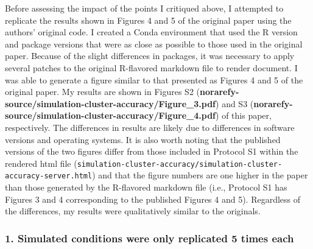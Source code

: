 \documentclass[
]{article}
\begin{document}
Before assessing the impact of the points I critiqued above, I attempted
to replicate the results shown in Figures 4 and 5 of the original paper
using the authors' original code. I created a Conda environment that
used the R version and package versions that were as close as possible
to those used in the original paper. Because of the slight differences
in packages, it was necessary to apply several patches to the original
R-flavored markdown file to render document. I was able to generate a
figure similar to that presented as Figures 4 and 5 of the original
paper. My results are shown in Figures S2
(\textbf{norarefy-source/simulation-cluster-accuracy/Figure\_3.pdf}) and
S3 (\textbf{norarefy-source/simulation-cluster-accuracy/Figure\_4.pdf})
of this paper, respectively. The differences in results are likely due
to differences in software versions and operating systems. It is also
worth noting that the published versions of the two figures differ from
those included in Protocol S1 within the rendered html file
(\texttt{simulation-cluster-accuracy/simulation-cluster-accuracy-server.html})
and that the figure numbers are one higher in the paper than those
generated by the R-flavored markdown file (i.e., Protocol S1 has Figures
3 and 4 corresponding to the published Figures 4 and 5). Regardless of
the differences, my results were qualitatively similar to the originals.

\hypertarget{simulated-conditions-were-only-replicated-5-times-each}{%
\subsubsection{1. Simulated conditions were only replicated 5 times
each}\label{simulated-conditions-were-only-replicated-5-times-each}}
\end{document}
